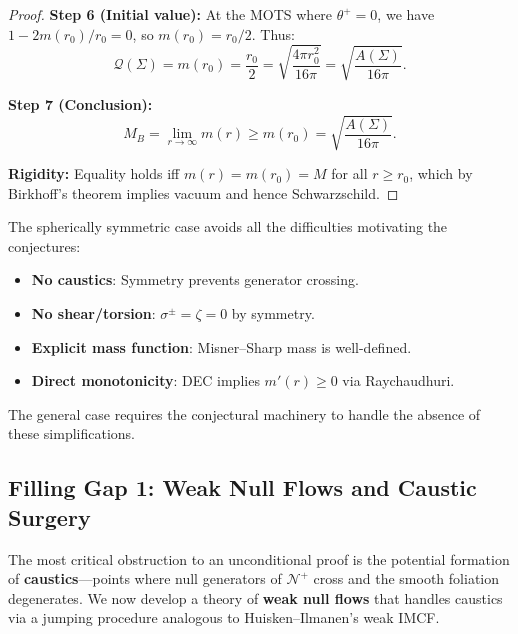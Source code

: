 \begin{proof}
\textbf{Step 6 (Initial value):} At the MOTS where $\theta^+ = 0$, we have $1 - 2m(r_0)/r_0 = 0$, so $m(r_0) = r_0/2$. Thus:
\begin{equation}
\mathcal{Q}(\Sigma) = m(r_0) = \frac{r_0}{2} = \sqrt{\frac{4\pi r_0^2}{16\pi}} = \sqrt{\frac{A(\Sigma)}{16\pi}}.
\end{equation}

\textbf{Step 7 (Conclusion):}
\begin{equation}
M_B = \lim_{r \to \infty} m(r) \geq m(r_0) = \sqrt{\frac{A(\Sigma)}{16\pi}}.
\end{equation}

\textbf{Rigidity:} Equality holds iff $m(r) = m(r_0) = M$ for all $r \geq r_0$, which by Birkhoff's theorem implies vacuum and hence Schwarzschild.
\end{proof}

\begin{remark}
The spherically symmetric case avoids all the difficulties motivating the conjectures:
\begin{itemize}
\item \textbf{No caustics}: Symmetry prevents generator crossing.
\item \textbf{No shear/torsion}: $\sigma^\pm = \zeta = 0$ by symmetry.
\item \textbf{Explicit mass function}: Misner--Sharp mass is well-defined.
\item \textbf{Direct monotonicity}: DEC implies $m'(r) \geq 0$ via Raychaudhuri.
\end{itemize}
The general case requires the conjectural machinery to handle the absence of these simplifications.
\end{remark}


\subsection{Filling Gap 1: Weak Null Flows and Caustic Surgery}
\label{subsec:gap1-weak-flow}

The most critical obstruction to an unconditional proof is the potential formation of \textbf{caustics}---points where null generators of $\mathcal{N}^+$ cross and the smooth foliation degenerates. We now develop a theory of \textbf{weak null flows} that handles caustics via a jumping procedure analogous to Huisken--Ilmanen's weak IMCF.

